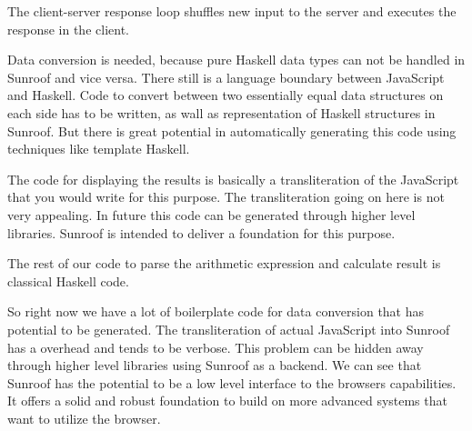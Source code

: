The client-server response loop shuffles new input to the server 
and executes the response in the client.

Data conversion is needed, because pure Haskell data types
can not be handled in Sunroof and vice versa. There still
is a language boundary between JavaScript and Haskell. 
Code to convert between two essentially equal data structures on 
each side has to be written, as wall as representation of Haskell 
structures in Sunroof. But there is great potential in automatically 
generating this code using techniques like template Haskell.

The code for displaying the results is basically a 
transliteration of the JavaScript that you would write for this 
purpose.
The transliteration going on here is not very appealing. 
In future this code can be generated through higher level 
libraries. Sunroof is intended to deliver a foundation for
this purpose.

The rest of our code to parse the arithmetic expression and calculate 
result is classical Haskell code. 

So right now we have a lot of boilerplate code for data conversion
that has potential to be generated.
The transliteration of actual JavaScript into Sunroof has a overhead and
tends to be verbose. This problem can be hidden away through 
higher level libraries using Sunroof as a backend. 
We can see that Sunroof has the potential to be a low level interface
to the browsers capabilities. It offers a solid and robust foundation to build
on more advanced systems that want to utilize the browser.

